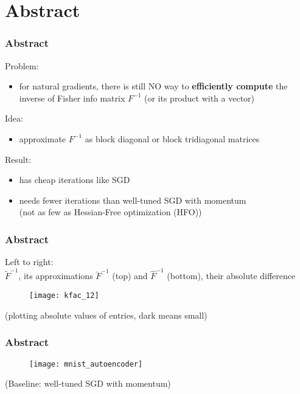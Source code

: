 \section{Abstract}

\begin{frame}
\frametitle{Abstract}

Problem:
\begin{itemize}
    \item for natural gradients, there is still NO way to \textbf{efficiently compute}
        the inverse of Fisher info matrix $F^{-1}$ (or its product with a vector)
\end{itemize}

Idea:
\begin{itemize}
    \item approximate $F^{-1}$ as block diagonal or block tridiagonal matrices
\end{itemize}

Result:
\begin{itemize}
    \item has cheap iterations like SGD
    \item needs fewer iterations than well-tuned SGD with momentum \\
        (not as few as Hessian-Free optimization (HFO))
\end{itemize}

\end{frame}

\begin{frame}
\frametitle{Abstract}
{\footnotesize
Left to right: \\
$\tilde{F}^{-1}$, its approximations $\breve{F}^{-1}$ (top) and $\hat{F}^{-1}$ (bottom), their absolute difference
}
\begin{figure}
    \centering
    \texttt{[image: kfac\_12]}
\end{figure}
(plotting absolute values of entries, dark means small)
\end{frame}

\begin{frame}
\frametitle{Abstract}
\begin{figure}
    \centering
    \texttt{[image: mnist\_autoencoder]}
\end{figure}
(Baseline: well-tuned SGD with momentum)
\end{frame}
